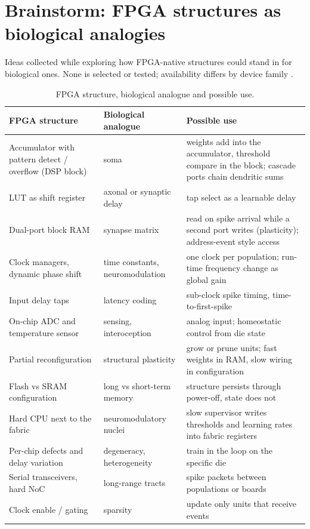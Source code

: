 \section{Brainstorm: FPGA structures as biological analogies}
\label{app:brainstorm}
Ideas collected while exploring how FPGA-native structures could stand in for biological ones. None is selected or tested; availability differs by device family .

\begin{table}[h]
\centering
\caption{FPGA structure, biological analogue and possible use.}
\begin{tabular}{@{}p{3.4cm}p{3.2cm}p{7.6cm}@{}}
\toprule
FPGA structure & Biological analogue & Possible use\\
\midrule
Accumulator with pattern detect / overflow (DSP block) & soma & weights add into the accumulator, threshold compare in the block; cascade ports chain dendritic sums\\
LUT as shift register & axonal or synaptic delay & tap select as a learnable delay\\
Dual-port block RAM & synapse matrix & read on spike arrival while a second port writes (plasticity); address-event style access\\
Clock managers, dynamic phase shift & time constants, neuromodulation & one clock per population; run-time frequency change as global gain\\
Input delay taps & latency coding & sub-clock spike timing, time-to-first-spike\\
On-chip ADC and temperature sensor & sensing, interoception & analog input; homeostatic control from die state\\
Partial reconfiguration & structural plasticity & grow or prune units; fast weights in RAM, slow wiring in configuration\\
Flash vs SRAM configuration & long vs short-term memory & structure persists through power-off, state does not\\
Hard CPU next to the fabric & neuromodulatory nuclei & slow supervisor writes thresholds and learning rates into fabric registers\\
Per-chip defects and delay variation & degeneracy, heterogeneity & train in the loop on the specific die\\
Serial transceivers, hard NoC & long-range tracts & spike packets between populations or boards\\
Clock enable / gating & sparsity & update only units that receive events\\
\bottomrule
\end{tabular}
\end{table}

